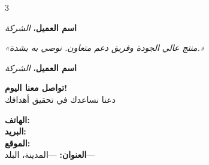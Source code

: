 \documentclass[11pt,a4paper,landscape]{article}
\begin{document}
\begin{multicols}{3}
\begin{testimonialbox}
\vspace{0.3em}
\upshape
\textemdash{} \textbf{اسم العميل}، \textit{الشركة}
\end{testimonialbox}

\vspace{0.3em}

\begin{testimonialbox}
\itshape\small
«منتج عالي الجودة وفريق دعم متعاون.%
نوصي به بشدة.»

\vspace{0.3em}
\upshape
\textemdash{} \textbf{اسم العميل}، \textit{الشركة}
\end{testimonialbox}

\begin{ctabox}
\begin{center}
{\Large\bfseries تواصل معنا اليوم!}\\[0.5em]
{\small دعنا نساعدك في تحقيق أهدافك}
\end{center}
\vspace{0.5em}

\textbf{الهاتف:} \\[0.2em]
\textbf{البريد:} \\[0.2em]
\textbf{الموقع:} \\[0.2em]
\textbf{العنوان:} ---المدينة، البلد---

\vspace{0.5em}
\begin{center}
\end{center}
\end{ctabox}

\end{multicols}
\end{document}
